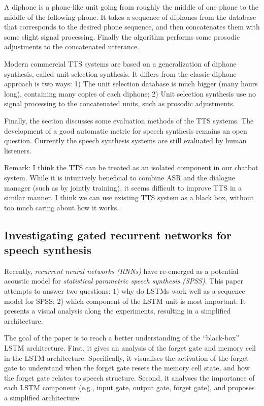 \documentclass[paper=a4, fontsize=18pt]{article} %
\numberwithin{equation}{section} %
\numberwithin{figure}{section} %
\numberwithin{table}{section} %
\begin{document}
A diphone is a phone-like unit going from roughly the middle of one phone to the middle of the following phone. It takes a sequence of diphones from the database that corresponds to the desired phone sequence, and then concatenates them with some slight signal processing. Finally the algorithm performs some prosodic adjustments to the concatenated utterance.

Modern commercial TTS systems are based on a generalization of diphone synthesis, called unit selection synthesis. It differs from the classic diphone approach is two ways: 1) The unit selection database is much bigger (many hours long), containing many copies of each diphone; 2) Unit selection synthesis use no signal processing to the concatenated units, such as prosodic adjustments.

Finally, the section discusses some evaluation methods of the TTS systems. The development of a good automatic metric for speech synthesis remains an open question. Currently the speech synthesis systems are still evaluated by human listeners.

Remark: I think the TTS can be treated as an isolated component in our chatbot system. While it is intuitively beneficial to combine ASR and the dialogue manager (such as by jointly training), it seems difficult to improve TTS in a similar manner. I think we can use existing TTS system as a black box, without too much caring about how it works.

\subsection{Investigating gated recurrent networks for speech synthesis \cite{Wu2016Investigating}}

Recently, \emph{recurrent neural networks (RNNs)} have re-emerged as a potential acoustic model for \emph{statistical parametric speech synthesis (SPSS)}. This paper attempts to answer two questions: 1) why do LSTMs work well as a sequence model for SPSS; 2) which component of the LSTM unit is most important. It presents a visual analysis along the experiments, resulting in a simplified architecture.

The goal of the paper is to reach a better understanding of the ``black-box'' LSTM architecture. First, it gives an analysis of the forget gate and memory cell in the LSTM architecture. Specifically, it visualises the activation of the forget gate to understand when the forget gate resets the memory cell state, and how the forget gate relates to speech structure. Second, it analyses the importance of each LSTM component (e.g., input gate, output gate, forget gate), and proposes a simplified architecture.
\end{document}
